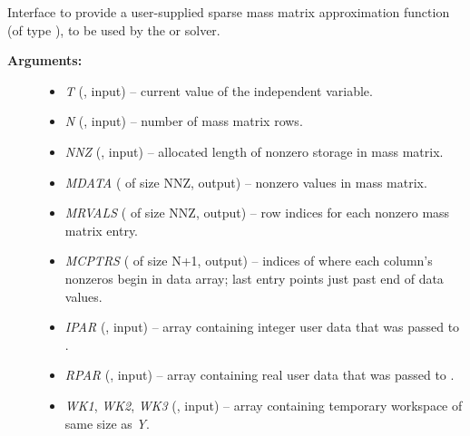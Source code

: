 \documentclass[letterpaper,10pt,english]{sphinxmanual}
\begin{document}
\begin{fulllineitems}
\label{f_interface/Usage:f/_/FARKSPMASS}
Interface to provide a user-supplied sparse mass matrix approximation
function (of type {\hyperref[c_interface/User_supplied:c.ARKSlsSparseMassFn]{\emph{}}}), to be used by the
{\hyperref[f_interface/Usage:f/_/FARKMASSKLU]{\emph{}}} or {\hyperref[f_interface/Usage:f/_/FARKMASSSUPERLUMT]{\emph{}}} solver.
\begin{description}
\item[{\textbf{Arguments:}}] \leavevmode\begin{itemize}
\item {} 
\emph{T} (, input) -- current value of the independent variable.

\item {} 
\emph{N} (, input) -- number of mass matrix rows.

\item {} 
\emph{NNZ} (, input) -- allocated length of nonzero storage
in mass matrix.

\item {} 
\emph{MDATA} ( of size NNZ, output) -- nonzero values
in mass matrix.

\item {} 
\emph{MRVALS} ( of size NNZ, output) -- row indices for each
nonzero mass matrix entry.

\item {} 
\emph{MCPTRS} ( of size N+1, output) -- indices of where
each column's nonzeros begin in data array; last entry points
just past end of data values.

\item {} 
\emph{IPAR} (, input) -- array containing integer user data that was passed to
{\hyperref[f_interface/Usage:f/_/FARKMALLOC]{\emph{}}}.

\item {} 
\emph{RPAR} (, input) -- array containing real user data that was passed to
{\hyperref[f_interface/Usage:f/_/FARKMALLOC]{\emph{}}}.

\item {} 
\emph{WK1}, \emph{WK2}, \emph{WK3}  (, input) -- array containing temporary workspace
of same size as \emph{Y}.


\end{itemize}
\end{description}
\end{fulllineitems}
\end{document}
